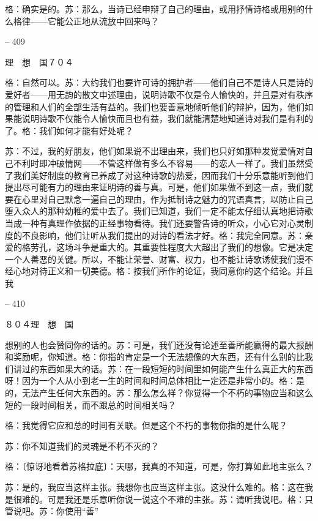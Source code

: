 \documentclass[11pt,oneside]{book}
\begin{document}
\begin{common-format}
    格：确实是的。苏：那么，当诗已经申辩了自己的理由，或用抒情诗格或用别的什么格律——它能公正地从流放中回来吗？

    

-- 409

    理　想　国７０４

    格：自然可以。苏：大约我们也要许可诗的拥护者——他们自己不是诗人只是诗的爱好者——用无韵的散文申述理由，说明诗歌不仅是令人愉快的，并且是对有秩序的管理和人们的全部生活有益的。我们也要善意地倾听他们的辩护，因为，他们如果能说明诗歌不仅能令人愉快而且也有益，我们就能清楚地知道诗对我们是有利的了。格：我们如何才能有好处呢？

    苏：不过，我的好朋友，他们如果说不出理由来，我们也只好如那种发觉爱情对自己不利时即冲破情网——不管这样做有多么不容易——的恋人一样了。我们虽然受了我们美好制度的教育已养成了对这种诗歌的热爱，因而我们十分乐意能听到他们提出尽可能有力的理由来证明诗的善与真。可是，他们如果做不到这一点，我们就要在心里对自己默念一遍自己的理由，作为抵制诗之魅力的咒语真言，以防止自己堕入众人的那种幼稚的爱中去了。我们已知道，我们一定不能太仔细认真地把诗歌当成一种有真理作依据的正经事物看待。我们还要警告诗的听众，小心它对心灵制度的不良影响，他们让听从我们提出的对诗的看法才好。格：我完全同意。苏：亲爱的格劳孔，这场斗争是重大的。其重要性程度大大超出了我们的想像。它是决定一个人善恶的关键。所以，不能让荣誉、财富、权力，也不能让诗歌诱使我们漫不经心地对待正义和一切美德。格：按我们所作的论证，我同意你的这个结论。并且我

    

-- 410

    ８０４理　想　国

    想别的人也会赞同你的话的。苏：可是，我们还没有论述至善所能赢得的最大报酬和奖励呢，你知道。格：你指的肯定是一个无法想像的大东西，还有什么别的比我们讲过的东西如果大的话。苏：在一段短短的时间里如何能产生什么真正大的东西呀！因为一个人从小到老一生的时间和时间总体相比一定还是非常小的。格：是的，无法产生任何大东西的。苏：那么怎么样？你觉得一个不朽的事物应当和这么短的一段时间相关，而不跟总的时间相关吗？

    格：我觉得它应和总的时间有关联。但是这个不朽的事物你指的是什么呢？

    苏：你不知道我们的灵魂是不朽不灭的？

    格：〔惊讶地看着苏格拉底〕：天哪，我真的不知道，可是，你打算如此地主张么？

    苏：是的，我应当这样主张。我想你也应当这样主张。这没什么难的。格：这在我是很难的。可是我还是乐意听你说一说这个不难的主张。苏：请听我说吧。格：只管说吧。苏：你使用“善”


\end{common-format}
\end{document}
